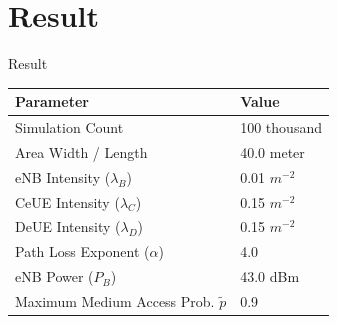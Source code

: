 \documentclass{beamer}
\begin{document}
\section{Result}

\begin{frame}{Result}
    \begin{center}
        \begin{tabular}{ | l | l | }
            \hline
                Parameter                                   &       Value               \\ \hline
                Simulation Count                            &       100 thousand        \\ \hline
                Area Width / Length                         &       40.0 meter          \\ \hline
                eNB Intensity ($\lambda_{B}$)               &       0.01 $m^{-2}$       \\ \hline
                CeUE Intensity ($\lambda_{C}$)              &       0.15 $m^{-2}$       \\ \hline
                DeUE Intensity ($\lambda_{D}$)              &       0.15 $m^{-2}$       \\ \hline
                Path Loss Exponent ($\alpha$)               &       4.0                 \\ \hline
                eNB Power ($P_{B}$)                         &       43.0 dBm            \\ \hline
                Maximum Medium Access Prob. $\tilde{p}$     &       0.9                 \\
            \hline
        \end{tabular}
    \end{center}
\end{frame}
\end{document}
